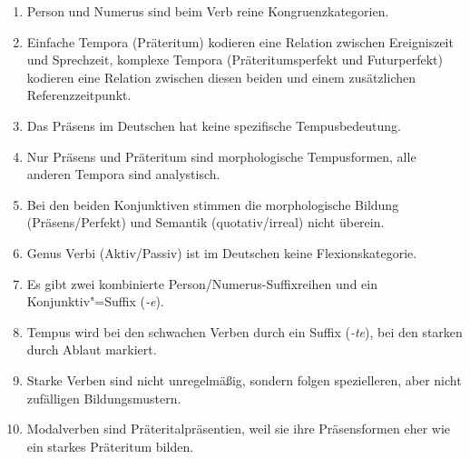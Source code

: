 \Zusammenfassung

\begin{enumerate}
  \item Person und Numerus sind beim Verb reine Kongruenzkategorien.
  \item Einfache Tempora (Präteritum) kodieren eine Relation zwischen Ereigniszeit und Sprechzeit, komplexe Tempora (Präteritumsperfekt und Futurperfekt) kodieren eine Relation zwischen diesen beiden und einem zusätzlichen Referenzzeitpunkt.
  \item Das Präsens im Deutschen hat keine spezifische Tempusbedeutung.
  \item Nur Präsens und Präteritum sind morphologische Tempusformen, alle anderen Tempora sind analystisch.
  \item Bei den beiden Konjunktiven stimmen die morphologische Bildung (Präsens\slash Perfekt) und Semantik (quotativ\slash irreal) nicht überein.
  \item Genus Verbi (Aktiv\slash Passiv) ist im Deutschen keine Flexionskategorie.
  \item Es gibt zwei kombinierte Person\slash Numerus-Suffixreihen und ein Konjunktiv"=Suffix (\textit{-e}).
  \item Tempus wird bei den schwachen Verben durch ein Suffix (\textit{-te}), bei den starken durch Ablaut markiert.
  \item Starke Verben sind nicht unregelmäßig, sondern folgen spezielleren, aber nicht zufälligen Bildungsmustern.
  \item Modalverben sind Präteritalpräsentien, weil sie ihre Präsensformen eher wie ein starkes Präteritum bilden.
\end{enumerate}

\Uebungen


